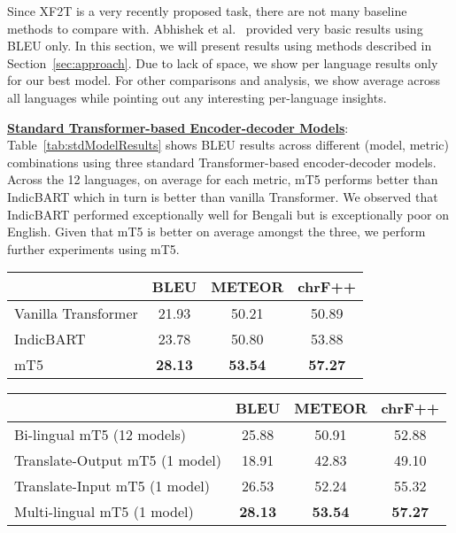 \documentclass[runningheads]{llncs}
\newcommand{\data}{\textsc{XAlignV2}}
\begin{document}
Since XF2T is a very recently proposed task, there are not many baseline methods to compare with. Abhishek et al.~\cite{abhishek2022xalign} provided very basic results using BLEU only. In this section, we will present results using methods described in Section~\ref{sec:approach}. Due to lack of space, we show per language results only for our best model. For other comparisons and analysis, we show average across all languages while pointing out any interesting per-language insights.

\noindent\underline{\textbf{Standard Transformer-based Encoder-decoder Models}}: Table~\ref{tab:stdModelResults} shows BLEU results across different (model, metric) combinations using three standard Transformer-based encoder-decoder models. Across the 12 languages, on average for each metric, mT5 performs better than IndicBART which in turn is better than vanilla Transformer. We observed that IndicBART performed exceptionally well for Bengali but is exceptionally poor on English. Given that mT5 is better on average amongst the three, we perform further experiments using mT5. 
\begin{table*}
\begin{minipage}{0.44\textwidth}
     \centering
    \scriptsize
    \begin{tabular}{|l||c|c|c|}
\hline
&BLEU&METEOR&chrF++\\
\hline
\hline
Vanilla Transformer&21.93&50.21&50.89\\
\hline
IndicBART&23.78&50.80&53.88\\
\hline
mT5&\textbf{28.13}&\textbf{53.54}&\textbf{57.27}\\
\hline
    \end{tabular}
    \caption{XF2T scores on \data{} test set using standard Transformer-based encoder-decoder models. Best results are highlighted.}
    \label{tab:stdModelResults}
\end{minipage}
\hspace{0.04\textwidth}
\begin{minipage}{0.48\textwidth}
    \centering
    \scriptsize
    \begin{tabular}{|l||c|c|c|}
\hline
&BLEU&METEOR&chrF++\\
\hline
\hline
Bi-lingual mT5 (12 models)&25.88&50.91&52.88\\
\hline
Translate-Output mT5 (1 model)&18.91&42.83&49.10\\
\hline
Translate-Input mT5 (1 model)&26.53&52.24&55.32\\
\hline
Multi-lingual mT5 (1 model)&\textbf{28.13}&\textbf{53.54}&\textbf{57.27}\\
\hline
    \end{tabular}
    \caption{XF2T scores on \data{} test set using bi-lingual, multi-lingual and translation-based variants of mT5 model. Best results are highlighted.}
    \label{tab:bi-lingualMulti-lingualTranslation}
\end{minipage}
\end{table*}
\end{document}

